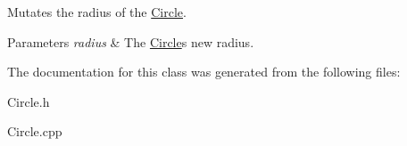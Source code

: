 Mutates the radius of the \hyperlink{classtsgl_1_1_circle}{Circle}. 


\begin{DoxyParams}{Parameters}
{\em radius} & The \hyperlink{classtsgl_1_1_circle}{Circle}\textquotesingle{}s new radius. \\
\hline
\end{DoxyParams}


The documentation for this class was generated from the following files\+:\begin{DoxyCompactItemize}
\item 
Circle.\+h\item 
Circle.\+cpp\end{DoxyCompactItemize}
